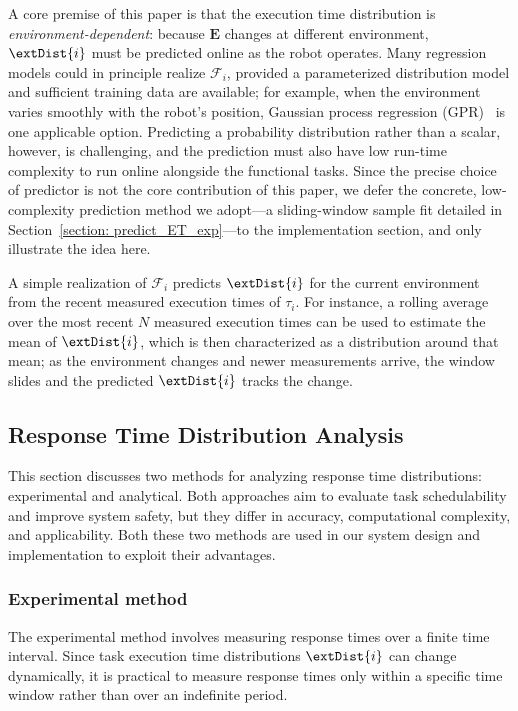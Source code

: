 A core premise of this paper is that the execution time distribution is \emph{environment-dependent}: because $\textbf{E}$ changes at different environment, $\extDist{i}$ must be predicted online as the robot operates.
Many regression models could in principle realize $\mathcal{F}_i$, provided a parameterized distribution model and sufficient training data are available; for example, when the environment varies smoothly with the robot's position, Gaussian process regression (GPR)~\cite{Rasmussen2005GaussianPF} is one applicable option.
Predicting a probability distribution rather than a scalar, however, is challenging, and the prediction must also have low run-time complexity to run online alongside the functional tasks.
Since the precise choice of predictor is not the core contribution of this paper, we defer the concrete, low-complexity prediction method we adopt---a sliding-window sample fit detailed in Section~\ref{section: predict_ET_exp}---to the implementation section, and only illustrate the idea here.

\begin{Example}
A simple realization of $\mathcal{F}_i$ predicts $\extDist{i}$ for the current environment from the recent measured execution times of $\tau_i$.
For instance, a rolling average over the most recent $N$ measured execution times can be used to estimate the mean of $\extDist{i}$, which is then characterized as a distribution around that mean; as the environment changes and newer measurements arrive, the window slides and the predicted $\extDist{i}$ tracks the change.
\end{Example}


	\subsection{Response Time Distribution Analysis}
	\label{section_rta}


    This section discusses two methods for analyzing response time distributions: experimental and analytical.
    Both approaches aim to evaluate task schedulability and improve system safety, but they differ in accuracy, computational complexity, and applicability.
    Both these two methods are used in our system design and implementation to exploit their advantages.

\subsubsection{Experimental method}
    The experimental method involves measuring response times over a finite time interval.
    Since task execution time distributions $\extDist{i}$ can change dynamically, it is practical to measure response times only within a specific time window rather than over an indefinite period.

